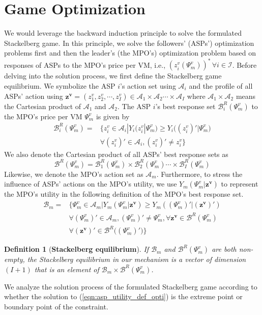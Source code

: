 \documentclass[conference]{IEEEtran}
\newtheorem{definition}{Definition}
\begin{document}
\section{Game Optimization} \label{sec:game_optimization}
We would leverage the backward induction principle to solve the formulated Stackelberg game. In this principle, we solve the followers' (ASPs') optimization problems first and then the leader's (the MPO's) optimization problem based on responses of ASPs to the MPO's price per VM, i.e., $(z_i^v(\Psi_m^v))^* \, \forall i \in \mathcal{I}$. Before delving into the solution process, we first define the Stackelberg game equilibrium. We symbolize the ASP $i$'s action set using $\mathcal{A}_i$ and the profile of all ASPs' action using $\bm{z^v}=(z_1^v, z_2^v, \cdots, z_I^v) \in \mathcal{A}_1 \times \mathcal{A}_2 \cdots \times \mathcal{A}_I$ where $\mathcal{A}_1 \times \mathcal{A}_2$ means the Cartesian product of $\mathcal{A}_1$ and $\mathcal{A}_2$. The ASP $i$'s best response set $\mathcal{B}_i^R(\Psi_m^v)$ to the MPO's price per VM $\Psi_m^v$ is given by 
\begin{equation} \label{eqn:asp_best_response}
\begin{aligned}
\mathcal{B}_i^R(\Psi_m^v) = &\{z_i^v \in \mathcal{A}_i |Y_i(z_i^v|\Psi_m^v) \geq Y_i\big((z_i^v)'|\Psi_m^v\big) \\
&\forall (z_i^v)' \in \mathcal{A}_i, (z_i^v)' \neq z_i^v\}
\end{aligned}
\end{equation}
We also denote the Cartesian product of all ASPs' best response sets as
\begin{equation}
\mathcal{B}^R(\Psi_m^v) = \mathcal{B}_1^R(\Psi_m^v) \times \mathcal{B}_2^R(\Psi_m^v) \cdots \times \mathcal{B}_I^R(\Psi_m^v)
\end{equation}
Likewise, we denote the MPO's action set as $\mathcal{A}_m$. Furthermore, to stress the influence of ASPs' actions on the MPO's utility, we use $Y_m(\Psi_m^v|\bm{z^v})$ to represent the MPO's utility in the following definition of the MPO's best response set.
\begin{equation} \label{eqn:mpo_best_response}
\begin{aligned}
\mathcal{B}_m = &\{\Psi_m^v \in \mathcal{A}_m| Y_m(\Psi_m^v|\bm{z^v}) \geq Y_m((\Psi_m^v)'|(\bm{z^v})') \\
&\forall (\Psi_m^v)' \in \mathcal{A}_m, (\Psi_m^v)' \neq \Psi_m^v, \forall \bm{z^v} \in \mathcal{B}^R(\Psi_m^v) \\
&\forall  (\bm{z^v})' \in \mathcal{B}^R\big((\Psi_m^v)'\big)\}
\end{aligned}
\end{equation}
\begin{definition}[\textbf{Stackelberg equilibrium}] \label{def:stackelberg_equilibrium}
If $\mathcal{B}_{m}$ and $\mathcal{B}^R(\Psi_m^v)$ are both non-empty, the Stackelberg equilibrium in our mechanism is a vector of dimension $(I+1)$ that is an element of $\mathcal{B}_m  \times \mathcal{B}^R(\Psi_m^v)$.
\end{definition}
We analyze the solution process of the formulated Stackelberg game according to whether the solution to (\ref{eqn:asp_utility_def_opti}) is the extreme point or boundary point of the constraint. 
\end{document}
